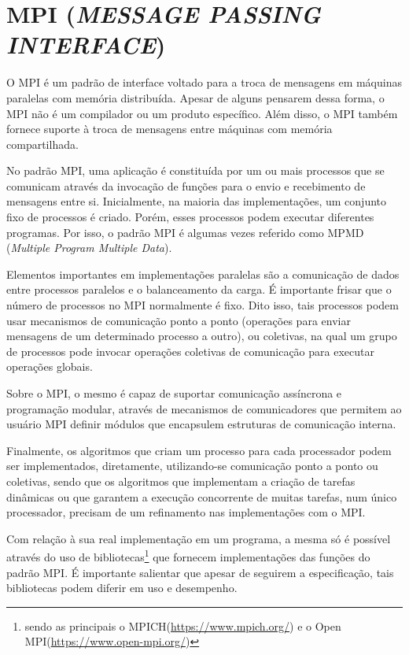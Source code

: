 \section{\normalsize MPI (\textit{MESSAGE PASSING INTERFACE})}\label{mpi}
	O  MPI é um padrão de interface voltado para a troca de mensagens em máquinas paralelas com memória distribuída. Apesar de alguns pensarem dessa forma, o MPI não é um compilador ou um produto específico. Além disso, o MPI também fornece suporte à troca de mensagens entre máquinas com memória compartilhada.
	
	No padrão MPI, uma aplicação é constituída por um ou mais processos que se comunicam através da invocação de funções para o envio e recebimento de mensagens entre si. Inicialmente, na maioria das implementações, um conjunto fixo de processos é criado. Porém, esses processos podem executar diferentes programas. Por isso, o padrão MPI é algumas vezes referido como MPMD (\textit{Multiple Program Multiple Data}).

	Elementos importantes em implementações paralelas são a comunicação de dados entre processos paralelos e o balanceamento da carga. É importante frisar que o número de processos no MPI normalmente é fixo. Dito isso, tais processos podem usar mecanismos de comunicação ponto a ponto (operações para enviar mensagens de um determinado processo a outro), ou coletivas, na qual um grupo de processos pode invocar operações coletivas de comunicação para executar operações globais. 

	Sobre o MPI, o mesmo é capaz de suportar comunicação assíncrona e programação modular, através de mecanismos de comunicadores que permitem ao usuário MPI definir módulos que encapsulem estruturas de comunicação interna.

	Finalmente, os algoritmos que criam um processo para cada processador podem ser implementados, diretamente, utilizando-se comunicação ponto a ponto ou coletivas, sendo que os algoritmos que implementam a criação de tarefas dinâmicas ou que garantem a execução concorrente de muitas tarefas, num único processador, precisam de um refinamento nas implementações com o MPI.
	
	Com relação à sua real implementação em um programa, a mesma só é possível através do uso de bibliotecas\footnote{sendo as principais o MPICH(\url{https://www.mpich.org/}) e o Open MPI(\url{https://www.open-mpi.org/})} que fornecem implementações das funções do padrão MPI. É importante salientar que apesar de seguirem a especificação, tais bibliotecas podem diferir em uso e desempenho.

